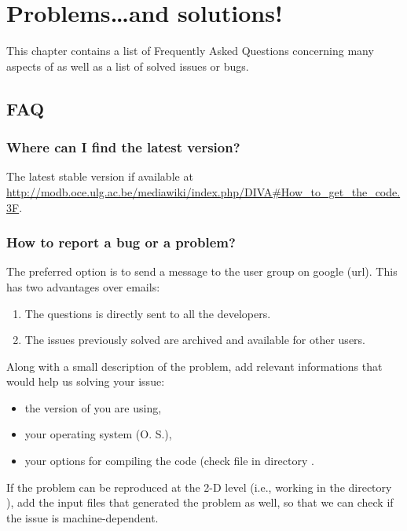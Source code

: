 \chapter{Problems\ldots and solutions!}

This chapter contains a list of Frequently Asked Questions concerning many aspects of \diva as well as a list of solved issues or bugs.

\minitoc


\section{FAQ}

\subsection{Where can I find the latest version?}

The latest stable version if available at \url{http://modb.oce.ulg.ac.be/mediawiki/index.php/DIVA#How_to_get_the_code.3F}. 


\subsection{How to report a bug or a problem?}

The preferred option is to send a message to the \diva user group on google (url{}). This has two advantages over emails:
\begin{enumerate}
\item The questions is directly sent to all the \diva developers.
\item The issues previously solved are archived and available for other users.
\end{enumerate}

Along with a small description of the problem, add relevant informations that would help us solving your issue:
\begin{itemize}
\item the version of \diva you are using,
\item your operating system (O. S.),
\item your options for compiling the code (check file  in directory .
\end{itemize}
If the problem can be reproduced at the 2-D level (i.e., working in the directory ), add the input files that generated the problem as well, so that we can check if the issue is machine-dependent. 

